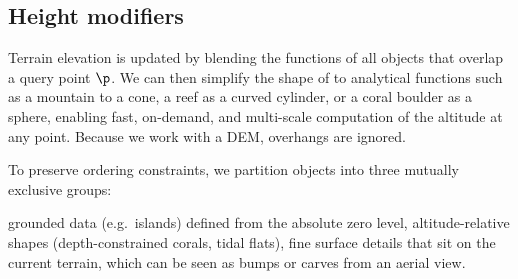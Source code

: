 \subsection{Height modifiers}

Terrain elevation is updated by blending the  functions of all objects that overlap a query point $\p$. We can then simplify the shape of  to analytical functions such as a mountain to a cone, a reef as a curved cylinder, or a coral boulder as a sphere, enabling fast, on-demand, and multi-scale computation of the altitude at any point. Because we work with a DEM, overhangs are ignored.

To preserve ordering constraints, we partition objects into three mutually exclusive groups:
\begin{Itemize}
    \Item{$\groundedHeight$} grounded data (e.g.\ islands) defined from the absolute zero level,
    \Item{$\altitudeHeight$} altitude-relative shapes (depth-constrained corals, tidal flats),
    \Item{$\surfaceHeight$} fine surface details that sit on the current terrain, which can be seen as bumps or carves from an aerial view.
\end{Itemize}











